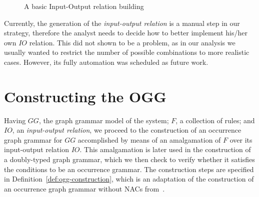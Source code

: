 \begin{example}
\begin{figure}[!ht]
  \caption{A basic Input-Output relation building}\label{fig:tests:inout}
\end{figure}

\end{example}

Currently, the generation of the \textit{input-output relation} is a manual step in our strategy, therefore the analyst needs to decide how to better implement his/her own $IO$ relation. This did not shown to be a problem, as in our analysis we usually wanted to restrict the number of possible combinations to more realistic cases. However, its fully automation was scheduled as future work.


\section{Constructing the OGG}

  Having $GG$, the graph grammar model of the system; $F$, a collection of rules; and $IO$, an \emph{input-output relation}, we proceed to the construction of an occurrence graph grammar for $GG$ accomplished by means of an amalgamation of $F$ over its input-output relation $IO$.
  This amalgamation is later used in the construction of a doubly-typed graph grammar, which we then check to verify whether it satisfies the conditions to be an occurrence grammar. The construction steps are specified in
  Definition~\ref{def:ogg-construction}, which is an adaptation of the construction of an occurrence graph grammar without NACs from~\cite{Corradini1996}.

